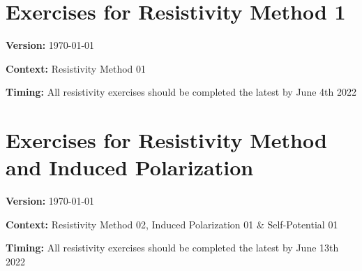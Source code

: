 \documentclass[a4paper,12pt]{article}
\begin{document}

  
  

    \setcounter{section}{4}
    \section{Exercises for Resistivity Method 1}
    \textbf{Version:} \today 
    
    \textbf{Context:} Resistivity Method 01
    
    \textbf{Timing:} All resistivity exercises should be completed the latest by June 4th 2022
    
    
    
    
    \setcounter{section}{5}
    \section{Exercises for Resistivity Method and Induced Polarization}
    \textbf{Version:} \today 
    
    \textbf{Context:} Resistivity Method 02, Induced Polarization 01 \& Self-Potential 01
    
    \textbf{Timing:} All resistivity exercises should be completed the latest by June 13th 2022
    
    
    
    
\end{document}
